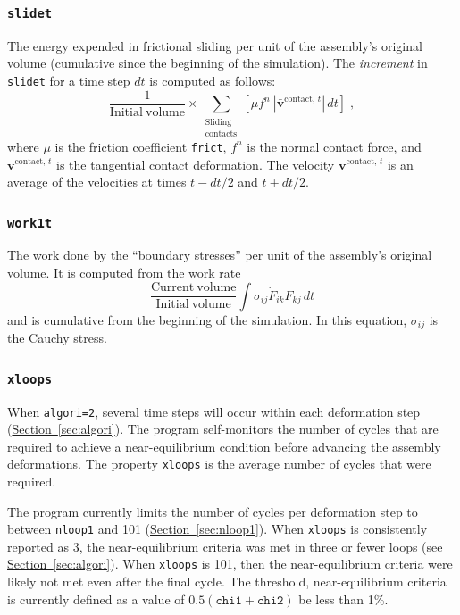 \documentclass[letterpaper,11pt]{article}
\begin{document}
\subsubsection{\texttt{slidet}}
The energy expended in frictional sliding per unit of the
assembly's original volume
(cumulative since the beginning of the simulation).
The \emph{increment} in \texttt{slidet} for a time step $dt$
is computed as follows:
\begin{equation}
\frac{1}{\mathrm{Initial\ volume}}
\times
\sum_{\substack{\text{Sliding}\\ \text{contacts}}} \left[
\mu f^{n} \: |\bar{\mathbf{v}}^{\text{contact, }t}|\,dt
\right]\;,
\end{equation}
where $\mu$ is the friction coefficient \texttt{frict},
$f^{n}$ is the normal contact force, and
$\bar{\mathbf{v}}^{\text{contact, }t}$ is the tangential contact
deformation.
The velocity $\bar{\mathbf{v}}^{\text{contact, }t}$
is an average of the velocities at times $t-dt/2$ and $t+dt/2$.
%
\subsubsection{\texttt{work1t}}
The work done by the ``boundary stresses'' per unit of the assembly's
original volume. 
It is computed from the work rate
\begin{equation}
\frac{\mathrm{Current\ volume}}{\mathrm{Initial\ volume}}
\int \sigma_{ij} \dot{F}_{ik} F_{kj}\,dt
\end{equation}
and is cumulative from the beginning of the simulation.
In this equation, $\sigma_{ij}$ is the Cauchy stress.
%
\subsubsection{\texttt{xloops}}\label{sec:xloops}
When \texttt{algori=2}, several time steps will occur 
within each deformation step
(\hyperref[sec:algori]{Section~\ref*{sec:algori}}).
The program self-monitors the number of cycles 
that are required to achieve a near-equilibrium
condition before advancing the assembly deformations.
The property \texttt{xloops} is the average number of cycles that
were required.
\par
The program currently limits the number of cycles
per deformation step to between \texttt{nloop1} and 101
(\hyperref[sec:nloop1]{Section~\ref*{sec:nloop1}}).
When \texttt{xloops} is consistently reported as 3,
the near-equilibrium criteria was met in three or fewer loops
(see \hyperref[sec:algori]{Section~\ref*{sec:algori}}).
When \texttt{xloops} is 101, then the near-equilibrium criteria
were likely not met even after the final cycle.
The threshold, near-equilibrium criteria is currently defined as a value
of $0.5(\mathtt{chi1} + \mathtt{chi2})$ be less than 1\%.
%
\end{document}
